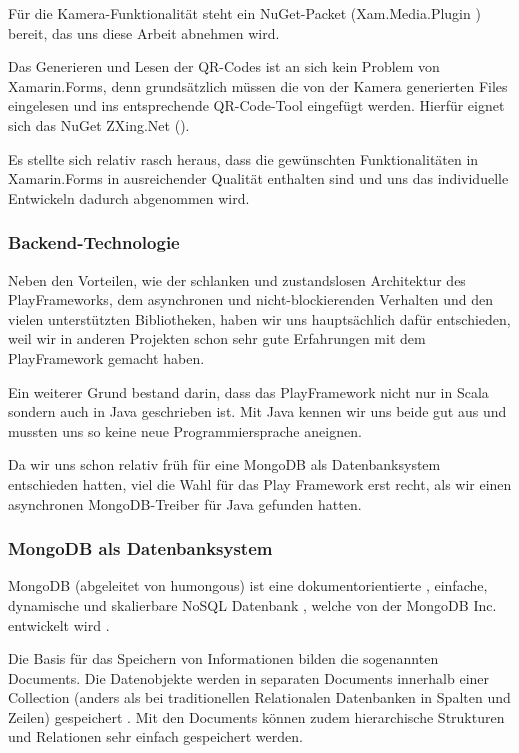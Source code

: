 Für die Kamera-Funktionalität steht ein NuGet-Packet (Xam.Media.Plugin \cite{xam-media-plugin}) bereit, das uns diese Arbeit abnehmen wird.

Das Generieren und Lesen der QR-Codes ist an sich kein Problem von Xamarin.Forms, denn grundsätzlich müssen die von der Kamera generierten Files eingelesen und ins entsprechende QR-Code-Tool eingefügt werden. Hierfür eignet sich das NuGet ZXing.Net (\cite{zxing.net}). 

Es stellte sich relativ rasch heraus, dass die gewünschten Funktionalitäten in Xamarin.Forms in ausreichender Qualität enthalten sind und uns das individuelle Entwickeln dadurch abgenommen wird.

\subsubsection{Backend-Technologie}
Neben den Vorteilen, wie der schlanken und zustandslosen Architektur des PlayFrameworks, dem asynchronen und nicht-blockierenden Verhalten und den vielen unterstützten Bibliotheken, haben wir uns hauptsächlich dafür entschieden, weil wir in anderen Projekten schon sehr gute Erfahrungen mit dem PlayFramework gemacht haben.

Ein weiterer Grund bestand darin, dass das PlayFramework nicht nur in Scala sondern auch in Java geschrieben ist. Mit Java kennen wir uns beide gut aus und mussten uns so keine neue Programmiersprache aneignen.

Da wir uns schon relativ früh für eine MongoDB als Datenbanksystem entschieden hatten, viel die Wahl für das Play Framework erst recht, als wir einen asynchronen MongoDB-Treiber für Java gefunden hatten.

\subsubsection{MongoDB als Datenbanksystem}
MongoDB (abgeleitet von humongous) ist eine dokumentorientierte , einfache, dynamische und skalierbare NoSQL Datenbank , welche von der MongoDB Inc. entwickelt wird \cite{MonogDBWikipedia} \cite{MonogDBDZone} \cite{MonogDB}. 

Die Basis für das Speichern von Informationen bilden die sogenannten Documents. Die Datenobjekte werden in separaten Documents innerhalb einer Collection (anders als bei traditionellen Relationalen Datenbanken in Spalten und Zeilen) gespeichert \cite{MonogDBDZone}. Mit den Documents können zudem  hierarchische Strukturen und Relationen sehr einfach gespeichert werden.


